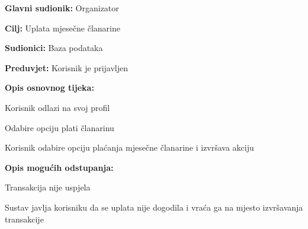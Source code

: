 				\noindent {}
				\begin{packed_item}
					
					\item \textbf{Glavni sudionik: }Organizator
					\item  \textbf{Cilj:} Uplata mjesečne članarine
					\item  \textbf{Sudionici:} Baza podataka
					\item  \textbf{Preduvjet:} Korisnik je prijavljen
					\item  \textbf{Opis osnovnog tijeka:}
					
					\item[] \begin{packed_enum}
						
						\item Korisnik odlazi na svoj profil
						\item Odabire opciju plati članarinu
						\item Korisnik odabire opciju plaćanja mjesečne članarine i izvršava akciju
					\end{packed_enum}
					
					\item  \textbf{Opis mogućih odstupanja:}
					
					\item[] \begin{packed_item}
						
						\item[3.a] Transakcija nije uspjela
						\item[] \begin{packed_enum}
							
							\item Sustav javlja korisniku da se uplata nije dogodila i vraća ga na mjesto izvršavanja transakcije
							
						\end{packed_enum}
						
					\end{packed_item}
				\end{packed_item}
				
